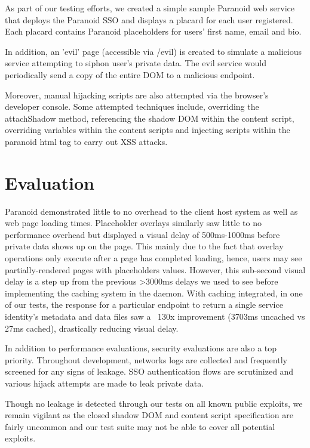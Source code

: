 \documentclass[letterpaper,twocolumn,10pt]{article}
\begin{document}
As part of our testing efforts, we created a simple sample Paranoid web service that deploys the Paranoid SSO and displays a placard for each user registered. Each placard contains Paranoid placeholders for users' first name, email and bio.

In addition, an 'evil' page (accessible via /evil) is created to simulate a  malicious service attempting to siphon user's private data. The evil service would periodically send a copy of the entire DOM to a malicious endpoint.

Moreover, manual hijacking scripts are also attempted via the browser's developer console. Some attempted techniques include, overriding the attachShadow method, referencing the shadow DOM within the content script, overriding variables within the content scripts and injecting scripts within the paranoid html tag to carry out XSS attacks.

\section{Evaluation}

Paranoid demonstrated little to no overhead to the client host system as well as web page loading times. Placeholder overlays similarly saw little to no performance overhead but displayed a visual delay of 500ms-1000ms before private data shows up on the page. This mainly due to the fact that overlay operations only execute after a page has completed loading, hence, users may see partially-rendered pages with placeholders values. However, this sub-second visual delay is a step up from the previous >3000ms delays we used to see before implementing the caching system in the daemon. With caching integrated, in one of our tests, the response for a particular endpoint to return a single service identity's metadata and data files saw a ~130x improvement (3703ms uncached vs 27ms cached), drastically reducing visual delay.

In addition to performance evaluations, security evaluations are also a top priority. Throughout development, networks logs are collected and frequently screened for any signs of leakage. SSO authentication flows are scrutinized and various hijack attempts are made to leak private data.  

Though no leakage is detected through our tests on all known public exploits, we remain vigilant as the closed shadow DOM and content script specification are fairly uncommon and our test suite may not be able to cover all potential exploits.
\end{document}
